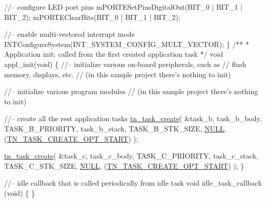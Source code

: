 \begin{DoxyCodeInclude}
   \textcolor{comment}{//-- configure LED port pins}
   mPORTESetPinsDigitalOut(BIT\_0 | BIT\_1 | BIT\_2);
   mPORTEClearBits(BIT\_0 | BIT\_1 | BIT\_2);

   \textcolor{comment}{//-- enable multi-vectored interrupt mode}
   INTConfigureSystem(INT\_SYSTEM\_CONFIG\_MULT\_VECTOR);
\}
\textcolor{comment}{}
\textcolor{comment}{/**}
\textcolor{comment}{ * Application init: called from the first created application task}
\textcolor{comment}{ */}
\textcolor{keywordtype}{void} appl\_init(\textcolor{keywordtype}{void})
\{
   \textcolor{comment}{//-- initialize various on-board peripherals, such as}
   \textcolor{comment}{//   flash memory, displays, etc.}
   \textcolor{comment}{//   (in this sample project there's nothing to init)}

   \textcolor{comment}{//-- initialize various program modules}
   \textcolor{comment}{//   (in this sample project there's nothing to init)}


   \textcolor{comment}{//-- create all the rest application tasks}
   \hyperlink{tn__tasks_8h_a548d5adda09d1b4e393b5df0e9e1a7a5}{tn\_task\_create}(
         &task\_b,
         task\_b\_body,
         TASK\_B\_PRIORITY,
         task\_b\_stack,
         TASK\_B\_STK\_SIZE,
         \hyperlink{tn__common_8h_a070d2ce7b6bb7e5c05602aa8c308d0c4}{NULL},
         (\hyperlink{tn__tasks_8h_a8fa2ef577d6bd159b3fae559839f98d5a0c9352496e4465eb7e1b29dab7544acc}{TN\_TASK\_CREATE\_OPT\_START})
         );

   \hyperlink{tn__tasks_8h_a548d5adda09d1b4e393b5df0e9e1a7a5}{tn\_task\_create}(
         &task\_c,
         task\_c\_body,
         TASK\_C\_PRIORITY,
         task\_c\_stack,
         TASK\_C\_STK\_SIZE,
         \hyperlink{tn__common_8h_a070d2ce7b6bb7e5c05602aa8c308d0c4}{NULL},
         (\hyperlink{tn__tasks_8h_a8fa2ef577d6bd159b3fae559839f98d5a0c9352496e4465eb7e1b29dab7544acc}{TN\_TASK\_CREATE\_OPT\_START})
         );
\}

\textcolor{comment}{//-- idle callback that is called periodically from idle task}
\textcolor{keywordtype}{void} idle\_task\_callback (\textcolor{keywordtype}{void})
\{
\}


\end{DoxyCodeInclude}
